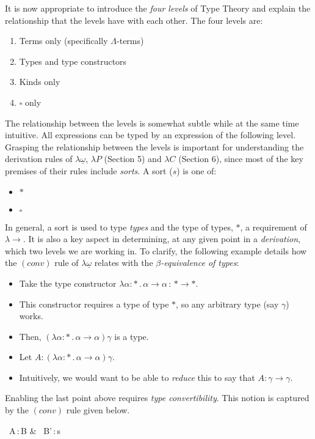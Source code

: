 \documentclass[9pt,preprint,nocopyrightspace,computermodern]{sigplanconf} %
\begin{document}
It is now appropriate to introduce the \textit{four levels} of Type Theory and
explain the relationship that the levels have with each other. The four levels are:
\begin{enumerate}
\item Terms only (specifically \(\Lambda\)-terms)
\item Types and type constructors
\item Kinds only
\item \(\square\) only
\end{enumerate}
The relationship between the levels is somewhat subtle while at the same time
intuitive. All expressions can be typed by an expression of the following level.
Grasping the relationship between the levels is important for understanding
the derivation rules of \(\lambda\underline\omega\), \(\lambda P\) (Section 5)
and \(\lambda C\) (Section 6), since most of the key premises of their rules include
\textit{sorts}. A sort (\(s\)) is one of:
\begin{itemize}
\item \(*\)
\item \(\square\)
\end{itemize}
In general, a sort is used to type \textit{types} and the type of types, \(*\),
a requirement of \(\lambda\!\!\rightarrow\). It is also a key aspect in determining,
at any given point in a \textit{derivation}, which two levels we are working in.
To clarify, the following example details how the \((conv)\) rule of
\(\lambda\underline\omega\) relates with the \textit{\(\beta\)-equivalence of types}:
\begin{itemize}
\item Take the type constructor \(\lambda\alpha :*\,.\,\alpha\rightarrow\alpha\,:\,*\rightarrow *\).
\item This constructor requires a type of type \(*\), so any arbitrary type (say \(\gamma\)) works.
\item Then, \((\lambda\alpha :*\,.\,\alpha\rightarrow\alpha)\)\(\gamma\) is a type.
\item Let \(A : (\lambda\alpha :*\,.\,\alpha\rightarrow\alpha)\gamma\).
\item Intuitively, we would want to be able to \textit{reduce} this to say that \(A : \gamma\rightarrow\gamma\).
\end{itemize}
Enabling the last point above requires \textit{type convertibility}. This notion is
captured by the \((conv)\) rule given below.
\begin{center}
        {\Gamma\vdash\, A\,:\,B & \Gamma\vdash\, B'\,:\,s}
\end{center}
\end{document}
